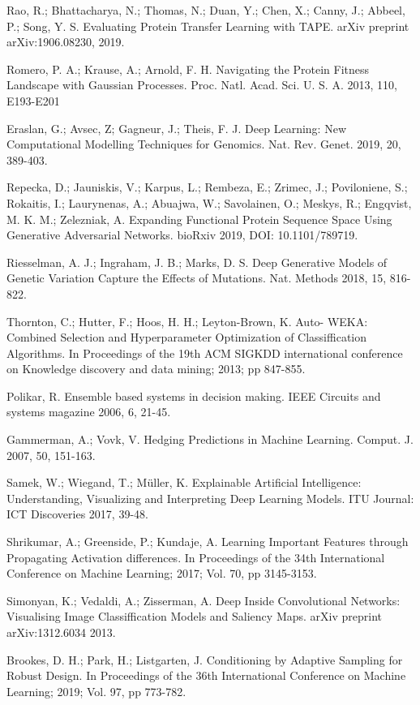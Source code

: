 \documentclass[12pt]{article}
\begin{document}
\begin{thebibliography}{20}
 Rao, R.; Bhattacharya, N.; Thomas, N.; Duan, Y.; Chen, X.; Canny, J.; Abbeel, P.; Song, Y. S. Evaluating Protein Transfer Learning with TAPE. arXiv preprint arXiv:1906.08230, 2019.


 Romero, P. A.; Krause, A.; Arnold, F. H. Navigating the Protein Fitness Landscape with Gaussian Processes. Proc. Natl. Acad. Sci. U. S. A. 2013, 110, E193-E201

 Eraslan, G.; Avsec, Z; Gagneur, J.; Theis, F. J. Deep Learning: New Computational Modelling Techniques for Genomics. Nat. Rev. Genet. 2019, 20, 389-403.

 Repecka, D.; Jauniskis, V.; Karpus, L.; Rembeza, E.; Zrimec, J.; Poviloniene, S.; Rokaitis, I.; Laurynenas, A.; Abuajwa, W.; Savolainen, O.; Meskys, R.; Engqvist, M. K. M.; Zelezniak, A. Expanding Functional Protein Sequence Space Using Generative Adversarial Networks. bioRxiv 2019, DOI: 10.1101/789719.

 Riesselman, A. J.; Ingraham, J. B.; Marks, D. S. Deep Generative Models of Genetic Variation Capture the Effects of Mutations. Nat. Methods 2018, 15, 816-822.

 Thornton, C.; Hutter, F.; Hoos, H. H.; Leyton-Brown, K. Auto- WEKA: Combined Selection and Hyperparameter Optimization of Classiffication Algorithms. In Proceedings of the 19th ACM SIGKDD international conference on Knowledge discovery and data mining; 2013; pp 847-855.

 Polikar, R. Ensemble based systems in decision making. IEEE Circuits and systems magazine 2006, 6, 21-45.

 Gammerman, A.; Vovk, V. Hedging Predictions in Machine Learning. Comput. J. 2007, 50, 151-163.

 Samek, W.; Wiegand, T.; Müller, K. Explainable Artificial Intelligence: Understanding, Visualizing and Interpreting Deep Learning Models. ITU Journal: ICT Discoveries 2017, 39-48. 

 Shrikumar, A.; Greenside, P.; Kundaje, A. Learning Important Features through Propagating Activation differences. In Proceedings of the 34th International Conference on Machine Learning; 2017; Vol. 70, pp 3145-3153.

 Simonyan, K.; Vedaldi, A.; Zisserman, A. Deep Inside Convolutional Networks: Visualising Image Classiffication Models and Saliency Maps. arXiv preprint arXiv:1312.6034 2013.

 Brookes, D. H.; Park, H.; Listgarten, J. Conditioning by Adaptive Sampling for Robust Design. In Proceedings of the 36th International Conference on Machine Learning; 2019; Vol. 97, pp 773-782.


\end{thebibliography}
\end{document}

